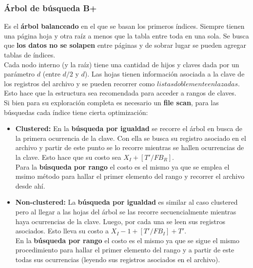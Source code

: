 \subsubsection*{Árbol de búsqueda B+}
Es el \textbf{árbol balanceado} en el que se basan los primeros índices. Siempre tienen una página hoja y otra raíz a menos que la tabla entre toda en una sola. Se busca que \textbf{los datos no se solapen} entre páginas y de sobrar lugar se pueden agregar tablas de índices. \\
Cada nodo interno (y la raíz) tiene una cantidad de hijos y claves dada por un parámetro $d$ (entre $d/2$ y $d$). Las hojas tienen información asociada a la clave de los registros del archivo y se pueden recorrer como $listas doblemente enlazadas$. Esto hace que la estructura sea recomendada para acceder a rangos de claves. \\
Si bien para su exploración completa es necesario un \textbf{file scan}, para las búsquedas cada índice tiene cierta optimización:
\begin{itemize}
    \item \textbf{Clustered:} En la \textbf{búsqueda por igualdad} se recorre el árbol en busca de la primera ocurrencia de la clave. Con ella se busca su registro asociado en el archivo y partir de este punto se lo recorre mientras se hallen ocurrencias de la clave. Esto hace que su costo sea $X_I + [T'/FB_R]$. \\
    Para la \textbf{búsqueda por rango} el costo es el mismo ya que se emplea el msimo método para hallar el primer elemento del rango y recorrer el archivo desde ahí.
    \item \textbf{Non-clustered:} La \textbf{búsqueda por igualdad} es similar al caso clustered pero al llegar a las hojas del árbol se las recorre secuencialmente mientras haya ocurrencias de la clave. Luego, por cada una se leen sus registros asociados. Esto lleva su costo a $X_I - 1 + [T'/FB_I] + T'$. \\
    En la \textbf{búsqueda por rango} el costo es el mismo ya que se sigue el mismo procedimiento para hallar el primer elemento del rango y a partir de este todas sus ocurrencias (leyendo sus registros asociados en el archivo).
\end{itemize}

